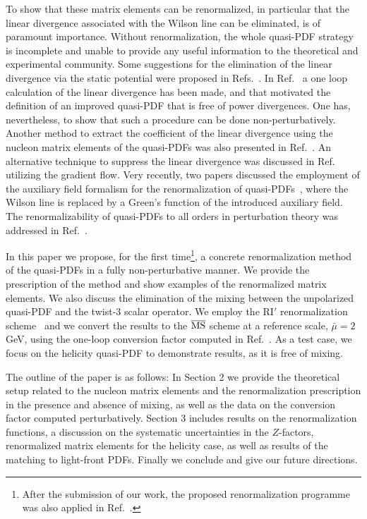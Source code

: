 \documentclass[12pt,tighten,nofootinbib,amssymb,floatfix]{article}
\newcommand{\MSb}{{\overline{\rm MS}}}
\begin{document}
\medskip
To show that these matrix elements can be renormalized, in particular that the linear divergence associated with
the Wilson line can be eliminated, is of paramount importance. Without renormalization, the whole quasi-PDF strategy
is incomplete and unable to provide any useful information to the theoretical and experimental community. Some suggestions
for the elimination of the linear divergence via the static potential were proposed in Refs.~\cite{Ma:2014jla,Ishikawa:2016znu}.
In Ref.~\cite{Chen:2016fxx} a one loop calculation of the linear divergence has been made, and that motivated the definition of an
improved quasi-PDF that is free of power divergences. One has, nevertheless, to show that such a procedure can be done non-perturbatively.
Another method to extract the coefficient of the linear divergence using the nucleon matrix elements of the quasi-PDFs was also presented 
in Ref.~\cite{Constantinou:2017sej}. An alternative technique to suppress the linear divergence was discussed in Ref.~\cite{Monahan:2016bvm} 
utilizing the gradient flow. Very recently, two papers discussed the employment of the auxiliary field formalism for the renormalization of 
quasi-PDFs~\cite{Ji:2017oey,Green:2017xeu}, where the Wilson line is replaced by a Green's function of the introduced auxiliary field. 
The renormalizability of quasi-PDFs to all orders in perturbation theory was addressed in Ref.~\cite{Ishikawa:2017faj}.

\medskip
In this paper we propose, for the first time\footnote{After the submission of our work, the proposed renormalization programme was also applied in Ref.~\cite{Chen:2017mzz}.}, a concrete renormalization method of the quasi-PDFs in a fully non-perturbative manner.
We provide the prescription of the method and show examples of the renormalized matrix elements. We also discuss the
elimination of the mixing between the unpolarized quasi-PDF and the twist-3 scalar operator.
We employ the RI$'$ renormalization scheme~\cite{Martinelli:1994ty} and we convert the results to the
$\MSb$ scheme at a reference scale, $\bar\mu{=}2$ GeV, using the one-loop conversion factor computed in Ref.~\cite{Constantinou:2017sej}.
As a test case, we focus on the helicity quasi-PDF to demonstrate results, as it is free of mixing.

\medskip
The outline of the paper is as follows: In Section 2 we provide the theoretical setup related to the nucleon
matrix elements and the renormalization prescription in the presence and absence of mixing,
as well as the data on the conversion factor computed perturbatively.
Section 3 includes results on the
renormalization functions, a discussion on the systematic uncertainties in the $Z$-factors, renormalized matrix elements for the helicity case, as well as results of the matching to light-front PDFs. Finally we conclude and give our future directions.
\end{document}
